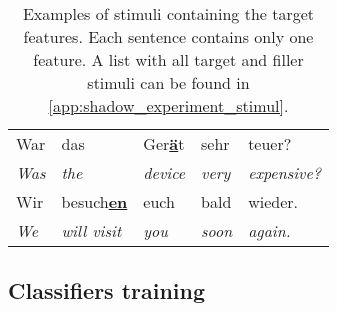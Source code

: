 %
\begin{table}[t]
	\centering
	\begin{tabularx}{\linewidth}{@{}*{5}{l}}
		\toprule
		
		War          	& das          			& Ger\textbf{\underline{ä}}t	& sehr          	& teuer? \\
		\emph{Was} 		& \emph{the} 			& \emph{device}           		& \emph{very} 		& \emph{expensive?} \\[0.3cm]
		
		
		Wir         	& besuch\textbf{\underline{en}} 						& euch				& bald          & wieder. \\
		\emph{We} 		& \emph{will visit}		& \emph{you} 					& \emph{soon} 		& \emph{again.} \\
		\bottomrule
	\end{tabularx}
	\caption[Example sentence for selected phonetic features]
		{Examples of stimuli containing the target features.
		 Each sentence contains only one feature.
		 A list with all target and filler stimuli can be found in \cref{app:shadow_experiment_stimul}.}
	\label{tab:target_features}
\end{table}

\subsection{Classifiers training}
\label{subsec:classifiers_training}

